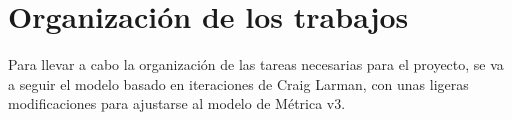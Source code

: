 

\section{Organización de los trabajos}


\par Para llevar a cabo la organización de las tareas necesarias para el proyecto, se va a seguir el modelo basado en iteraciones de Craig Larman, con unas ligeras modificaciones para ajustarse al modelo de Métrica v3.

